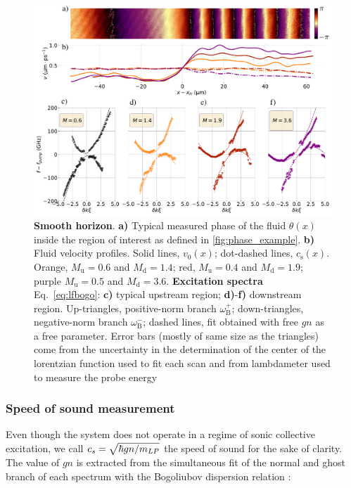 \bigskip
\begin{figure}[h]
    \centering
    \includegraphics[width=1\textwidth]{chap_custom_st/fig/bh_smooth.pdf}
    \caption{\textbf{Smooth horizon}.
    \textbf{a)} Typical measured phase of the fluid $\theta(x)$ inside the region of interest as defined in \autoref{fig:phase_example}.
    \textbf{\textbf{b)}} Fluid velocity profiles.
    Solid lines, $v_0(x)$; dot-dashed lines, $c_\mathrm{s}(x)$. Orange, $M_\mathrm{u}=0.6$ and $M_\mathrm{d}=1.4$; red, $M_\mathrm{u}=0.4$ and $M_\mathrm{d}=1.9$; purple $M_\mathrm{u}=0.5$ and $M_\mathrm{d}=3.6$.
    \textbf{Excitation spectra} Eq.~\eqref{eq:lfbogo}: \textbf{c)} typical upstream region; \textbf{d)}-\textbf{f)} downstream region.
    Up-triangles, positive-norm branch $\omega_\mathrm{B}^+$; down-triangles, negative-norm branch $\omega_\mathrm{B}^-$; dashed lines, fit obtained with free $gn$ as a free parameter. Error bars (mostly of same size as the triangles) come from the uncertainty in the determination
    of the center of the lorentzian function used to fit each scan and from lambdameter used to measure the probe energy \label{fig:smooth_transition}}
\end{figure}


\subsubsection{Speed of sound measurement} Even though the system does not operate in a regime of sonic collective excitation, we call $c_s=\sqrt{\hbar g n/m_{LP}}$ the speed of sound for the sake of clarity. The value of $gn$ is extracted 
from the simultaneous fit of the normal and ghost branch of each spectrum with the Bogoliubov dispersion relation :

